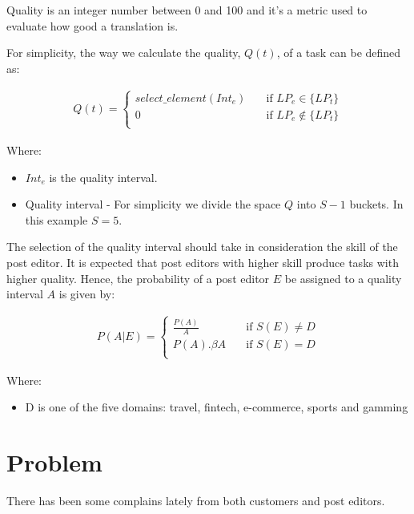\documentclass[]{extarticle}
\begin{document}
Quality is an integer number between 0 and 100 and it's a metric used to evaluate how good a translation is. 

For simplicity, the way we calculate the quality, $Q(t)$, of a task can be defined as:

\begin{align}
Q(t) =
  \begin{cases}
    select\_element(Int_e)      & \quad \text{if } LP_e \in \{LP_t\}  \\
    0  & \quad \text{if } LP_e \notin \{LP_t\}  \\
  \end{cases}
\end{align}

Where:

\begin{itemize}
\item $Int_e$ is the quality interval. 
\item Quality interval - For simplicity we divide the space $Q$ into $S-1$ buckets. In this example $S=5$.
\end{itemize}

The selection of the quality interval should take in consideration the skill of the post editor. It is expected that post editors with higher skill produce tasks with higher quality. Hence, the probability of a post editor $E$ be assigned to a quality interval $A$ is given by:


\begin{align}
P(A | E) =
  \begin{cases}
    \frac{P(A)}{A}      & \quad \text{if } S(E) \neq D  \\
    P(A) . \beta A         & \quad \text{if } S(E) = D  \\
  \end{cases}
\end{align}

Where:

\begin{itemize}
\item D is one of the five domains: travel, fintech, e-commerce, sports and gamming
\end{itemize}


\section{Problem}

There has been some complains lately from both customers and post editors. 
\end{document}
